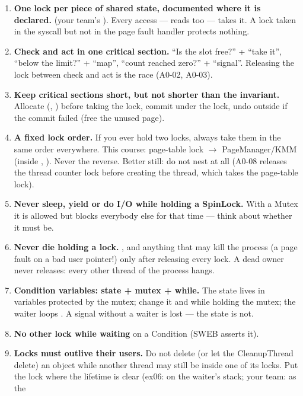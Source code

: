 \begin{enumerate}
\item \textbf{One lock per piece of shared state, documented where it is declared.}
   (your team's ). Every access
  --- reads too --- takes it. A lock taken in the syscall but not in the page fault handler
  protects nothing.
\item \textbf{Check and act in one critical section.} ``Is the slot free?'' + ``take it'',
  ``below the limit?'' + ``map'', ``count reached zero?'' + ``signal''. Releasing the lock
  between check and act is the race (A0-02, A0-03).
\item \textbf{Keep critical sections short, but not shorter than the invariant.} Allocate
  (, ) before taking the lock, commit under the lock, undo outside
  if the commit failed (free the unused page).
\item \textbf{A fixed lock order.} If you ever hold two locks, always take them in the same
  order everywhere. This course: page-table lock $\to$ PageManager/KMM (inside ,
  ). Never the reverse. Better still: do not nest at all (A0-08 releases the thread
  counter lock before creating the thread, which takes the page-table lock).
\item \textbf{Never sleep, yield or do I/O while holding a SpinLock.} With a Mutex it is
  allowed but blocks everybody else for that time --- think about whether it must be.
\item \textbf{Never die holding a lock.} ,  and anything that
  may kill the process (a page fault on a bad user pointer!) only after releasing every lock.
  A dead owner never releases: every other thread of the process hangs.
\item \textbf{Condition variables: state + mutex + while.} The state lives in variables
  protected by the mutex; change it and  while holding the mutex; the waiter
  loops . A signal without a waiter is lost --- the state is not.
\item \textbf{No other lock while waiting} on a Condition (SWEB asserts it).
\item \textbf{Locks must outlive their users.} Do not delete (or let the CleanupThread delete)
  an object while another thread may still be inside one of its locks. Put the lock where
  the lifetime is clear (ex06: on the waiter's stack; your team:  as the

\end{enumerate}
